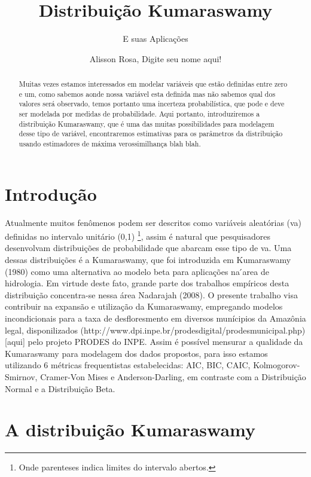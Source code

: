 \documentclass[
]{article}
\title{Distribuição Kumaraswamy}
\subtitle{E suas Aplicações}
\author{Alisson Rosa, Digite seu nome aqui!}
\date{}
\begin{document}
\maketitle
\begin{abstract}
Muitas vezes estamos interessados em modelar variáveis que estão
definidas entre zero e um, como sabemos aonde nossa variável esta
definida mas não sabemos qual dos valores será observado, temos portanto
uma incerteza probabilística, que pode e deve ser modelada por medidas
de probabilidade. Aqui portanto, introduziremos a distribuição
Kumaraswamy, que é uma das muitas possibilidades para modelagem desse
tipo de variável, encontraremos estimativas para os parâmetros da
distribuição usando estimadores de máxima verossimilhança blah blah.
\end{abstract}
\ifdefined\Shaded\renewenvironment{Shaded}{\begin{tcolorbox}[boxrule=0pt, enhanced, borderline west={3pt}{0pt}{shadecolor}, frame hidden, sharp corners, breakable, interior hidden]}{\end{tcolorbox}}\fi

\section{\centering Introdução}

Atualmente muitos fenômenos podem ser descritos como variáveis
aleatórias (va) definidas no intervalo unitário (0,1) \footnote{Onde
  parenteses indica limites do intervalo abertos.}, assim é natural que
pesquisadores desenvolvam distribuições de probabilidade que abarcam
esse tipo de va. Uma dessas distribuições é a Kumaraswamy, que foi
introduzida em Kumaraswamy (1980) como uma alternativa ao modelo beta
para aplicações na ́area de hidrologia. Em virtude deste fato, grande
parte dos trabalhos empíricos desta distribuição concentra-se nessa área
Nadarajah (2008). O presente trabalho visa contribuir na expansão e
utilização da Kumaraswamy, empregando modelos incondicionais para a taxa
de desfloresmento em diversos munícipios da Amazônia legal,
disponilizados
(http://www.dpi.inpe.br/prodesdigital/prodesmunicipal.php){[}aqui{]}
pelo projeto PRODES do INPE. Assim é possível mensurar a qualidade da
Kumaraswamy para modelagem dos dados propostos, para isso estamos
utilizando 6 métricas frequentistas estabelecidas: AIC, BIC, CAIC,
Kolmogorov-Smirnov, Cramer-Von Mises e Anderson-Darling, em contraste
com a Distribuição Normal e a Distribuição Beta.

\section{\centering A distribuição Kumaraswamy}
\end{document}
